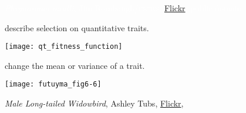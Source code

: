 \documentclass[t]{beamer}
\begin{document}

{
\begin{frame}[b]

\vfilll

\tiny \textcolor{white}{\textit{Phrynosoma mcalli}, Jim Rorabaugh/\textsc{usfws}, \href{https://www.flickr.com/photos/54430347@N04/5162160238}{Flickr}, public domain}

\end{frame}}


{
\begin{frame}[b]

\vfilll


\end{frame}}


\begin{frame}[t]{ describe selection on quantitative traits.}

\vspace{-0.5\baselineskip}

\centering
\texttt{[image: qt\_fitness\_function]}

\vfilll

\end{frame}


\begin{frame}[t]{ change the mean or variance of a trait.}

\vspace{-0.5\baselineskip}

\centering
\texttt{[image: futuyma\_fig6-6]}

\end{frame}

{
\begin{frame}[t]

\vfilll

\tiny \textit{Male Long-tailed Widowbird}, Ashley Tubs,  \href{https://www.flickr.com/photos/47745688@N05/14808464640}{Flickr},  

\end{frame}}
\end{document}
